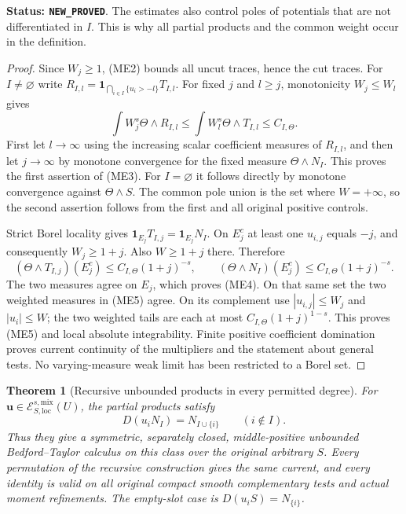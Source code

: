 \documentclass[11pt,a4paper]{article}
\numberwithin{equation}{section}
\newtheorem{theorem}{Theorem}[section]
\theoremstyle{definition}
\theoremstyle{remark}
\begin{document}
\noindent\textbf{Status: \texttt{NEW\_PROVED}}.  The estimates
also control poles of potentials that are not differentiated in $I$.
This is why all partial products and the common weight occur in the
definition.

\begin{proof}
Since $W_j\geq1$, (ME2) bounds all uncut traces, hence the cut traces.
For $I\ne\varnothing$ write
$R_{I,l}=\mathbf1_{\bigcap_{i\in I}\{u_i>-l\}}T_{I,l}$.
For fixed $j$ and $l\geq j$, monotonicity $W_j\leq W_l$ gives
\[
 \int W_j^s\Theta\wedge R_{I,l}
       \leq\int W_l^s\Theta\wedge T_{I,l}\leq C_{I,\Theta}.
\]
First let $l\to\infty$ using the increasing scalar coefficient
measures of $R_{I,l}$, and then let $j\to\infty$ by monotone
convergence for the fixed measure $\Theta\wedge N_I$.
This proves the first assertion of (ME3).  For $I=\varnothing$
it follows directly by monotone convergence against $\Theta\wedge S$.
The common pole union is the set where $W=+\infty$, so the second
assertion follows from the first and all original positive controls.

Strict Borel locality gives
$\mathbf1_{E_j}T_{I,j}=\mathbf1_{E_j}N_I$.  On $E_j^c$ at least
one $u_{i,j}$ equals $-j$, and consequently $W_j\geq1+j$.
Also $W\geq1+j$ there.  Therefore
\[
 (\Theta\wedge T_{I,j})(E_j^c)\leq C_{I,\Theta}(1+j)^{-s},
 \qquad
 (\Theta\wedge N_I)(E_j^c)\leq C_{I,\Theta}(1+j)^{-s}.
\]
The two measures agree on $E_j$, which proves (ME4).
On that same set the two weighted measures in (ME5) agree.
On its complement use $|u_{i,j}|\leq W_j$ and $|u_i|\leq W$;
the two weighted tails are each at most
$C_{I,\Theta}(1+j)^{1-s}$.  This proves (ME5) and local absolute
integrability.  Finite positive coefficient domination proves current
continuity of the multipliers and the statement about general tests.
No varying-measure weak limit has been restricted to a Borel set.
\end{proof}

\begin{theorem}[Recursive unbounded products in every permitted degree]
\label{thm:r11-superlinear-recursion}
For $\mathbf u\in\mathcal E^{s,\mathrm{mix}}_{S,\mathrm{loc}}(U)$,
the partial products satisfy
\[
                       D(u_iN_I)=N_{I\cup\{i\}}
              \qquad (i\notin I).
 \tag{ME6}
\]
Thus they give a symmetric, separately closed, middle-positive
unbounded Bedford--Taylor calculus on this class over the original
arbitrary $S$.  Every permutation of the recursive construction gives
the same current, and every identity is valid on all original compact
smooth complementary tests and actual moment refinements.  The
empty-slot case is $D(u_iS)=N_{\{i\}}$.
\end{theorem}
\end{document}
